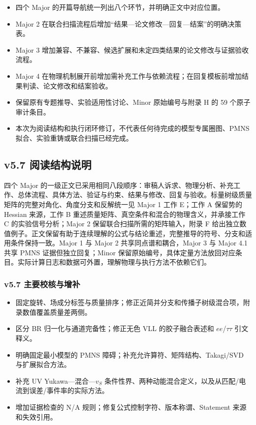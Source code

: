 \documentclass[
]{article}
\providecommand{\tightlist}{%
  \setlength{\itemsep}{0pt}\setlength{\parskip}{0pt}}
\begin{document}
\begin{itemize}
\tightlist
\item
  四个 Major 的开篇导航统一列出八个环节，并明确正文中对应位置。
\item
  Major 2
  在联合扫描流程后增加``结果---论文修改---回复---结案''的明确决策表。
\item
  Major 3
  增加兼容、不兼容、候选扩展和未定四类结果的论文修改与证据验收流程。
\item
  Major 4
  在物理机制展开前增加需补充工作与依赖流程；在回复模板前增加结果判读、论文修改和结案验收。
\item
  保留原有专题推导、实验适用性讨论、Minor 原始编号与附录 H 的 59
  个原子审计条目。
\item
  本次为阅读结构和执行闭环修订，不代表任何待完成的模型专属圈图、PMNS
  拟合、实验重铸或联合扫描已经完成。
\end{itemize}

\subsection{v5.7
阅读结构说明}\label{v5.7-ux9605ux8bfbux7ed3ux6784ux8bf4ux660e}

四个 Major
的一级正文已采用相同八段顺序：审稿人诉求、物理分析、补充工作、总体流程、具体方法、验证与约束、结果与修改、回复与验收。标量树级质量矩阵的完整对角化、角度分支和反解统一见
Major 1 工作 E；工作 A 保留势的 Hessian 来源，工作 B
重述质量矩阵、真空条件和混合的物理含义，并承接工作 C
的实验信号分析；Major 2 保留联合扫描所需的矩阵输入，附录 F
给出独立数值例子。正文保留有助于连续理解的公式与结论重述，完整推导的符号、分支和适用条件保持一致。Major
1 与 Major 2 共享同点谱和耦合，Major 3 与 Major 4.1 共享 PMNS
证据但独立回复；Minor
保留原始编号，具体定量方法放回对应条目。实际计算日志和数据可外置，理解物理与执行方法不依赖它们。

\subsubsection{v5.7
主要校核与增补}\label{v5.7-ux4e3bux8981ux6821ux6838ux4e0eux589eux8865}

\begin{itemize}
\tightlist
\item
  固定旋转、场成分标签与质量排序；修正近简并分支和传播子树级混合项，附录数值覆盖质量差两侧。
\item
  区分 BR 归一化与通道完备性；修正无色 VLL 的胶子融合表述和
  \(ee\)/\(\tau\tau\) 引文释义。
\item
  明确固定最小模型的 PMNS 障碍；补充允许算符、矩阵结构、Takagi/SVD
  与扩展拟合方法。
\item
  补充 UV Yukawa---混合---\(v_S\)
  条件性界、两种动能混合定义，以及从匹配/电流到误差/事件率的实际方法。
\item
  增加证据检查的 N/A 规则；修复公式控制字符、版本称谓、Statement
  来源和失效引用。
\end{itemize}
\end{document}
